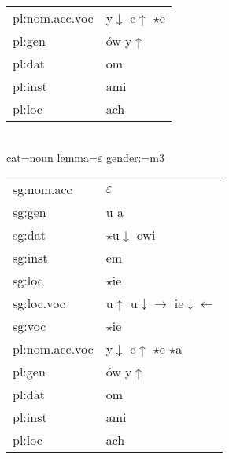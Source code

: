 \documentclass{article}
\begin{document}
\begin{multicols}{2}
\begin{tabular}{l|l}
pl:nom.acc.voc & y$\downarrow$ e$\uparrow$ $\star$e\\
pl:gen & ów y$\uparrow$\\
pl:dat & om\\
pl:inst & ami\\
pl:loc & ach\\
\end{tabular}\\
cat=noun lemma=$\varepsilon$ gender:=m3\\
\begin{tabular}{l|l}
sg:nom.acc & $\varepsilon$\\
sg:gen & u a\\
sg:dat & $\star$u$\downarrow$ owi\\
sg:inst & em\\
sg:loc & $\star$ie\\
sg:loc.voc & u$\uparrow$ u$\downarrow\rightarrow$ ie$\downarrow\leftarrow$\\
sg:voc & $\star$ie\\
pl:nom.acc.voc & y$\downarrow$ e$\uparrow$ $\star$e $\star$a\\
pl:gen & ów y$\uparrow$\\
pl:dat & om\\
pl:inst & ami\\
pl:loc & ach\\
\end{tabular}\\
\end{multicols}
\end{document}
